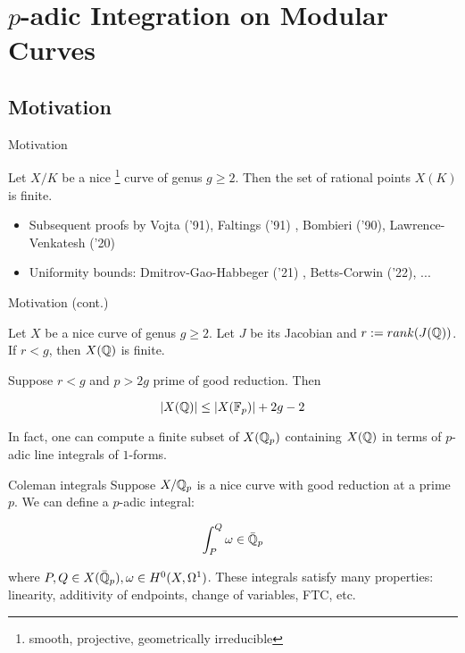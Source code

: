 \section{$p$-adic Integration on Modular Curves}

\subsection{Motivation}

\begin{frame}{Motivation}
\begin{theorem}[Faltings '83]
Let $X/K$ be a nice \footnote{smooth, projective, geometrically irreducible} curve of genus $g \geq 2$. Then the set of rational points $X(K)$ is finite.
\end{theorem} \pause
\begin{itemize}
\item Subsequent proofs by Vojta ('91), Faltings ('91) , Bombieri ('90), Lawrence-Venkatesh ('20) \pause
\item Uniformity bounds: Dmitrov-Gao-Habbeger ('21) , Betts-Corwin ('22), ...
\end{itemize}
\end{frame}

\begin{frame}{Motivation (cont.)}
\begin{theorem}[Chabauty '41]
Let $X$ be a nice curve of genus $g \geq 2$. Let $J$ be its Jacobian and $r:= rank(J(\mathbb{Q}))$. If $r < g$, then $X(\mathbb{Q})$ is finite.
\end{theorem} \pause

\begin{theorem}[Coleman '85]
Suppose $r < g$ and $p > 2g$ prime of good reduction. Then

\[
|X(\mathbb{Q})| \leq |X(\mathbb{F}_p)| + 2g -2 
\]

\pause In fact, one can compute a finite subset of $X(\mathbb{Q}_p)$ containing $X(\mathbb{Q})$ in terms of $p$-adic line integrals of $1$-forms.
\end{theorem}
\end{frame}

\begin{frame}{Coleman integrals}
Suppose $X/\mathbb{Q}_p$ is a nice curve with good reduction at a prime $p$. We can define a $p$-adic integral:

\[
\int_P^Q \omega \in \bar{\mathbb{Q}}_p
\]

where $P,Q \in X(\bar{\mathbb{Q}}_p), \omega \in H^0(X, \Omega^1)$. These integrals satisfy many properties: linearity, additivity of endpoints, change of variables, FTC, etc.
\end{frame}

